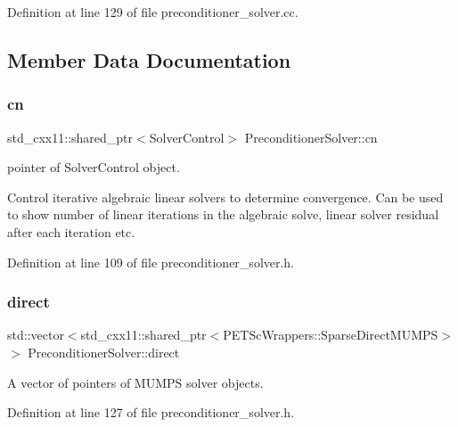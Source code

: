 Definition at line 129 of file preconditioner\+\_\+solver.\+cc.



\subsection{Member Data Documentation}
\mbox{\label{class_preconditioner_solver_a3170128a1c287f729fa40c9aff2f2eed}} 
\subsubsection{\texorpdfstring{cn}{cn}}
{\footnotesize\ttfamily std\+\_\+cxx11\+::shared\+\_\+ptr$<$Solver\+Control$>$ Preconditioner\+Solver\+::cn\hspace{0.3cm}{\ttfamily [private]}}



pointer of Solver\+Control object. 

Control iterative algebraic linear solvers to determine convergence. Can be used to show number of linear iterations in the algebraic solve, linear solver residual after each iteration etc. 

Definition at line 109 of file preconditioner\+\_\+solver.\+h.

\mbox{\label{class_preconditioner_solver_acd3bde261fb29c50e15ffe6ecd78ee5f}} 
\subsubsection{\texorpdfstring{direct}{direct}}
{\footnotesize\ttfamily std\+::vector$<$std\+\_\+cxx11\+::shared\+\_\+ptr$<$P\+E\+T\+Sc\+Wrappers\+::\+Sparse\+Direct\+M\+U\+M\+PS$>$ $>$ Preconditioner\+Solver\+::direct\hspace{0.3cm}{\ttfamily [private]}}



A vector of pointers of M\+U\+M\+PS solver objects. 



Definition at line 127 of file preconditioner\+\_\+solver.\+h.

\mbox{\label{class_preconditioner_solver_a0241f0b26a8c964fc1e3fd8fef5a20a6}} 
